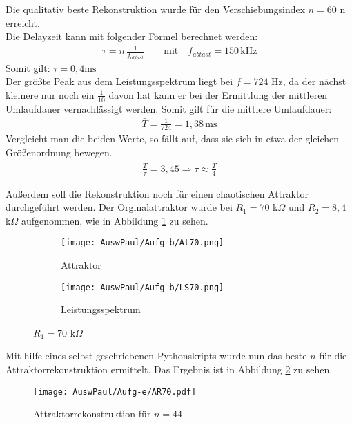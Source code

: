 Die qualitativ beste Rekonstruktion wurde für den Verschiebungsindex $n= 60$ n erreicht.\\
Die Delayzeit kann mit folgender Formel berechnet werden: 
\begin{align}
    \tau = n \, \frac{1}{f_{abtast}} \qquad \text{mit} \quad f_{abtast} = 150 \, \text{kHz}
\end{align}
Somit gilt: $\tau = 0,4 \text{ms}$ \\

Der größte Peak aus dem Leistungsspektrum liegt bei $f=724$ Hz, da der nächst kleinere nur noch ein $\frac{1}{10}$ davon hat kann er bei der Ermittlung der mittleren Umlaufdauer vernachlässigt werden. Somit gilt für die mittlere Umlaufdauer: 
\begin{align}
    \bar{T} = \frac{1}{724} = 1,38 \, \text{ms}
\end{align}
Vergleicht man die beiden Werte, so fällt auf, dass sie sich in etwa der gleichen Größenordnung bewegen.
\begin{align}
    \frac{\bar{T}}{\tau} = 3,45 \Rightarrow \tau \approx \frac{\bar{T}}{4}
\end{align}

\newpage
Außerdem soll die Rekonstruktion noch für einen chaotischen Attraktor durchgeführt werden. Der Orginalattraktor wurde bei $R_1 = 70$ k$\Omega$ und $R_2 = 8,4$ k$\Omega$ aufgenommen, wie in Abbildung \ref{fig:A70E} zu sehen.
\begin{figure}[h]
    \centering
    \begin{subfigure}[b]{0.45\textwidth}
        \centering
        \texttt{[image: AuswPaul/Aufg-b/At70.png]}
        \caption{Attraktor}
    \end{subfigure}
    \hfill
    \begin{subfigure}[b]{0.45\textwidth}
        \centering
        \texttt{[image: AuswPaul/Aufg-b/LS70.png]}
        \caption{Leistungsspektrum}
    \end{subfigure}
    \caption{$R_1 = 70$ k$\Omega$}
    \label{fig:A70E}
\end{figure}

Mit hilfe eines selbst geschriebenen Pythonskripts wurde nun das beste $n$ für die Attraktorrekonstruktion ermittelt. Das Ergebnis ist in Abbildung \ref{fig:AR70} zu sehen.

\begin{figure}[h]
    \centering
    \texttt{[image: AuswPaul/Aufg-e/AR70.pdf]}
    \caption{Attraktorrekonstruktion für $n=44$}
    \label{fig:AR70}
\end{figure}

